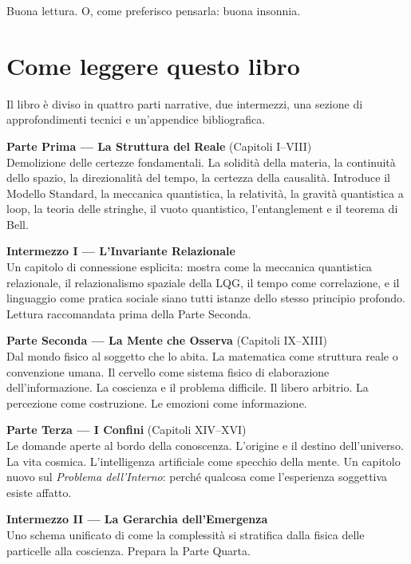 \documentclass[12pt,a4paper,openany]{book}
\begin{document}
Buona lettura. O, come preferisco pensarla: buona insonnia.

\clearpage

\chapter*{Come leggere questo libro}

Il libro è diviso in quattro parti narrative, due intermezzi, una sezione di approfondimenti tecnici e un'appendice bibliografica.

\textbf{Parte Prima — La Struttura del Reale} (Capitoli I–VIII)\\
Demolizione delle certezze fondamentali. La solidità della materia, la continuità dello spazio, la direzionalità del tempo, la certezza della causalità. Introduce il Modello Standard, la meccanica quantistica, la relatività, la gravità quantistica a loop, la teoria delle stringhe, il vuoto quantistico, l'entanglement e il teorema di Bell.

\textbf{Intermezzo I — L'Invariante Relazionale}\\
Un capitolo di connessione esplicita: mostra come la meccanica quantistica relazionale, il relazionalismo spaziale della LQG, il tempo come correlazione, e il linguaggio come pratica sociale siano tutti istanze dello stesso principio profondo. Lettura raccomandata prima della Parte Seconda.

\textbf{Parte Seconda — La Mente che Osserva} (Capitoli IX–XIII)\\
Dal mondo fisico al soggetto che lo abita. La matematica come struttura reale o convenzione umana. Il cervello come sistema fisico di elaborazione dell'informazione. La coscienza e il problema difficile. Il libero arbitrio. La percezione come costruzione. Le emozioni come informazione.

\textbf{Parte Terza — I Confini} (Capitoli XIV–XVI)\\
Le domande aperte al bordo della conoscenza. L'origine e il destino dell'universo. La vita cosmica. L'intelligenza artificiale come specchio della mente. Un capitolo nuovo sul \textit{Problema dell'Interno}: perché qualcosa come l'esperienza soggettiva esiste affatto.

\textbf{Intermezzo II — La Gerarchia dell'Emergenza}\\
Uno schema unificato di come la complessità si stratifica dalla fisica delle particelle alla coscienza. Prepara la Parte Quarta.
\end{document}
